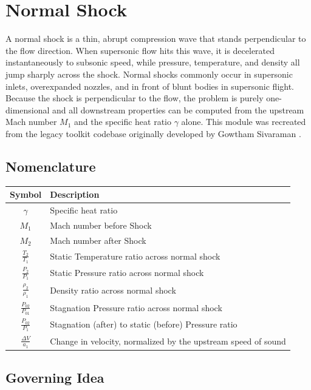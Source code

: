 \chapter{Normal Shock}

A normal shock is a thin, abrupt compression wave that stands perpendicular to the flow direction. When supersonic flow hits this wave, it is decelerated instantaneously to subsonic speed, while pressure, temperature, and density all jump sharply across the shock. Normal shocks commonly occur in supersonic inlets, overexpanded nozzles, and in front of blunt bodies in supersonic flight. Because the shock is perpendicular to the flow, the problem is purely one-dimensional and all downstream properties can be computed from the upstream Mach number $M_1$ and the specific heat ratio $\gamma$ alone. This module was recreated from the legacy toolkit codebase originally developed by Gowtham Sivaraman \cite{sivaraman2015}.

\section{Nomenclature}

\begin{center}
\begin{tabular}{@{}cl@{}}
\toprule
Symbol & Description \\
\midrule
$\gamma$ & Specific heat ratio \\
$M_1$ & Mach number before Shock \\
$M_2$ & Mach number after Shock \\
$\frac{T_2}{T_1}$ & Static Temperature ratio across normal shock \\
$\frac{P_2}{P_1}$ & Static Pressure ratio across normal shock \\
$\frac{\rho_2}{\rho_1}$ & Density ratio across normal shock \\
$\frac{P_{02}}{P_{01}}$ & Stagnation Pressure ratio across normal shock \\
$\frac{P_{02}}{P_1}$ & Stagnation (after) to static (before) Pressure ratio \\
$\frac{\Delta V}{a_1}$ & Change in velocity, normalized by the upstream speed of sound \\
\bottomrule
\end{tabular}
\end{center}

\section{Governing Idea}


